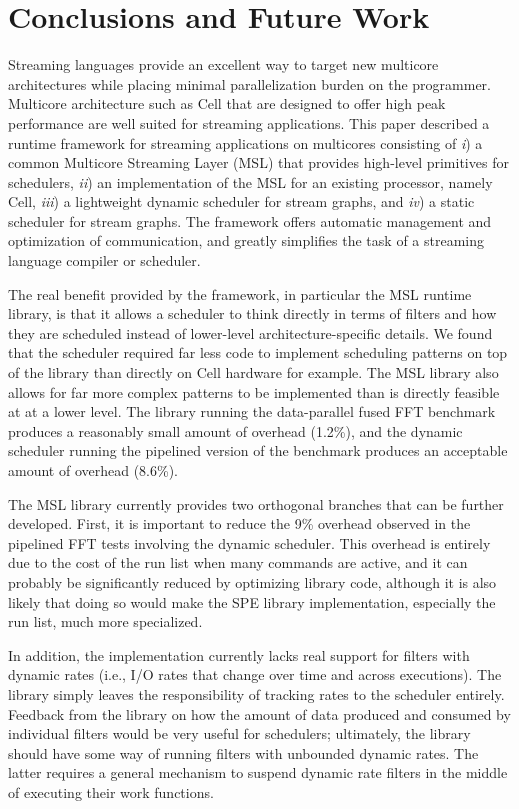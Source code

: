 \section{Conclusions and Future Work}\label{ch:conc}

Streaming languages provide an excellent way to
target new multicore architectures while placing minimal
parallelization burden on the programmer. Multicore architecture such
as Cell that are designed to offer high peak performance are well
suited for streaming applications. This paper described a runtime
framework for streaming applications on multicores consisting of
\emph{i}) a common Multicore Streaming Layer (MSL) that provides
high-level primitives for schedulers, \emph{ii}) an implementation
of the MSL for an existing processor, namely Cell, \emph{iii}) a
lightweight dynamic scheduler for stream graphs, and \emph{iv}) a
static scheduler for stream graphs. The framework offers automatic
management and optimization of communication, and greatly
simplifies the task of a streaming language compiler or scheduler.

The real benefit provided by the framework, in particular the MSL
runtime library, is that it allows a scheduler to think directly in
terms of filters and how they are scheduled instead of lower-level
architecture-specific details. We found that the scheduler required
far less code to implement scheduling patterns on top of the library
than directly on Cell hardware for example. The MSL library also
allows for far more complex patterns to be implemented than is
directly feasible at at a lower level. The library running the
data-parallel fused FFT benchmark produces a reasonably small amount
of overhead (1.2\%), and the dynamic scheduler running the pipelined
version of the benchmark produces an acceptable amount of overhead
(8.6\%).

The MSL library currently provides two orthogonal branches that can be
further developed. First, it is important to reduce the 9\% overhead
observed in the pipelined FFT tests involving the dynamic
scheduler. This overhead is entirely due to the cost of the run list
when many commands are active, and it can probably be significantly
reduced by optimizing library code, although it is also likely that
doing so would make the SPE library implementation, especially the run
list, much more specialized.

In addition, the implementation currently lacks real support for
filters with dynamic rates (i.e., I/O rates that change over time and
across executions). The library simply leaves the responsibility of
tracking rates to the scheduler entirely. Feedback from the library on
how the amount of data produced and consumed by individual filters
would be very useful for schedulers; ultimately, the library should
have some way of running filters with unbounded dynamic rates. The
latter requires a general mechanism to suspend dynamic rate filters in
the middle of executing their work functions.

